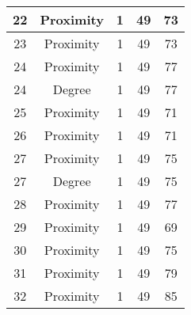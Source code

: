 \documentclass[results.tex]{subfiles}
\begin{document}
\begin{center}
\begin{tabular}{| c || c | c | c | c |}
            \hline
            22                      & Proximity                    & 1                      & 49                      & 73                   \\
            \hline
            23                      & Proximity                    & 1                      & 49                      & 73                   \\
            \hline
            24                      & Proximity                    & 1                      & 49                      & 77                   \\
            \hline
            24                      & Degree                       & 1                      & 49                      & 77                   \\
            \hline
            25                      & Proximity                    & 1                      & 49                      & 71                   \\
            \hline
            26                      & Proximity                    & 1                      & 49                      & 71                   \\
            \hline
            27                      & Proximity                    & 1                      & 49                      & 75                   \\
            \hline
            27                      & Degree                       & 1                      & 49                      & 75                   \\
            \hline
            28                      & Proximity                    & 1                      & 49                      & 77                   \\
            \hline
            29                      & Proximity                    & 1                      & 49                      & 69                   \\
            \hline
            30                      & Proximity                    & 1                      & 49                      & 75                   \\
            \hline
            31                      & Proximity                    & 1                      & 49                      & 79                   \\
            \hline
            32                      & Proximity                    & 1                      & 49                      & 85                   \\

\end{tabular}
\end{center}
\end{document}
